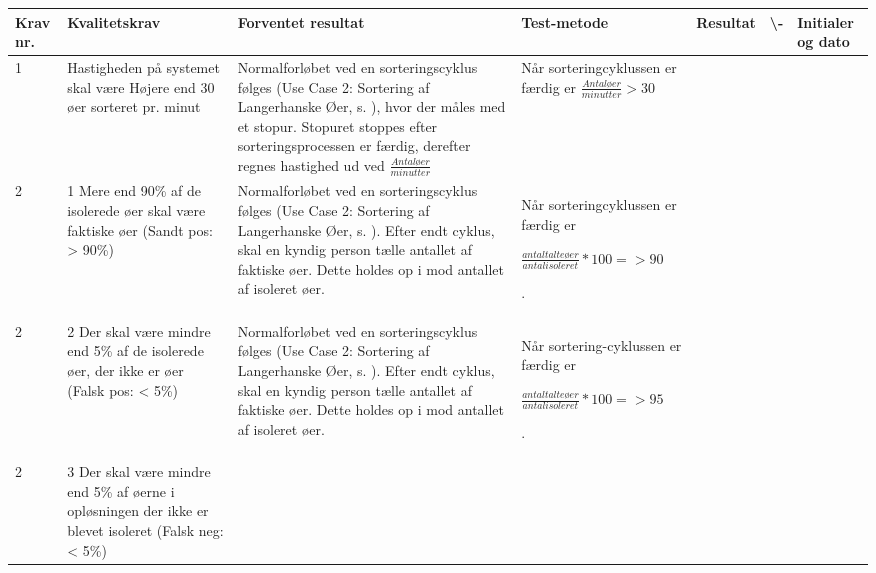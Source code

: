 \begin{center}
		\begin{longtable}{ | m{1.785cm} | m{1.785cm}| m{1.785cm}| m{1.785cm}| m{1.785cm}| m{1.785cm}|m{1.785cm}| } 
			\hline
			\textbf{Krav nr.} &\textbf{ Kvalitetskrav} & \textbf{Forventet resultat} & \textbf{Test-metode} &\textbf{Resultat} & \textbf{ \checkmark \textbackslash -} & \textbf{Initialer og dato} \\ 
			
			\hline
			1 &  Hastigheden på systemet skal være Højere end 30 øer sorteret pr. minut & Normalforløbet ved en sorteringscyklus følges (Use Case 2: Sortering af Langerhanske Øer, s. \pageref{uc:2}), hvor der måles med et stopur. Stopuret stoppes efter sorteringsprocessen er færdig, derefter regnes hastighed ud ved 
$\frac{Antal øer}{minutter}$			
			
			 & Når sorteringcyklussen er færdig er
			$\frac{Antal øer}{minutter}>30$
 &  & & \\
			\hline
			
			2 &  1 Mere end 90\% af de isolerede øer skal være faktiske øer 
(Sandt pos: > 90\%)
 & Normalforløbet ved en sorteringscyklus følges (Use Case 2: Sortering af Langerhanske Øer, s. \pageref{uc:2}). Efter endt cyklus, skal en kyndig person tælle antallet af faktiske øer. Dette holdes op i mod antallet af isoleret øer. & Når sorteringcyklussen er færdig er

 $\frac{antal talte øer}{antal isoleret}*100=>90$


.   &  & & \\
			\hline
			
			2 &  2 Der skal være mindre end 5\% af de isolerede øer, der ikke er øer
(Falsk pos: < 5\%)
 & Normalforløbet ved en sorteringscyklus følges (Use Case 2: Sortering af Langerhanske Øer, s.  \pageref{uc:2}). Efter endt cyklus, skal en kyndig person tælle antallet af faktiske øer. Dette holdes op i mod antallet af isoleret øer.  & Når sortering-cyklussen er færdig er

$\frac{antal talte øer}{antal isoleret}*100=>95$


.   &  & & \\

			\hline
2 &  3 Der skal være mindre end 5\% af øerne i opløsningen der ikke er blevet isoleret
(Falsk neg: < 5\%)


\end{longtable}
\end{center}
